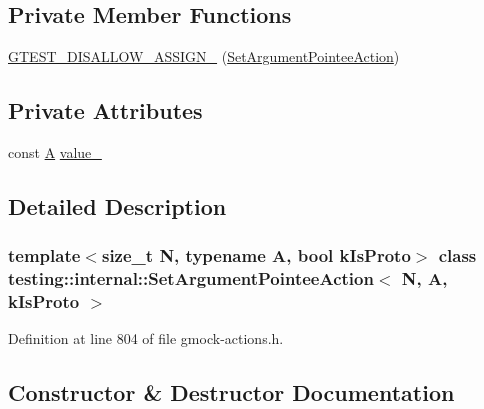 \subsection*{Private Member Functions}
\begin{DoxyCompactItemize}
\item 
\hyperlink{classtesting_1_1internal_1_1SetArgumentPointeeAction_ae2680fa62fa184b56c88743141baac60}{G\+T\+E\+S\+T\+\_\+\+D\+I\+S\+A\+L\+L\+O\+W\+\_\+\+A\+S\+S\+I\+G\+N\+\_\+} (\hyperlink{classtesting_1_1internal_1_1SetArgumentPointeeAction}{Set\+Argument\+Pointee\+Action})
\end{DoxyCompactItemize}
\subsection*{Private Attributes}
\begin{DoxyCompactItemize}
\item 
const \hyperlink{namespacetesting_a5e9134d655d2fc9323902348083282e7}{A} \hyperlink{classtesting_1_1internal_1_1SetArgumentPointeeAction_a57dba59652a5ea603c5e12c72e195b13}{value\+\_\+}
\end{DoxyCompactItemize}


\subsection{Detailed Description}
\subsubsection*{template$<$size\+\_\+t N, typename A, bool k\+Is\+Proto$>$\newline
class testing\+::internal\+::\+Set\+Argument\+Pointee\+Action$<$ N, A, k\+Is\+Proto $>$}



Definition at line 804 of file gmock-\/actions.\+h.



\subsection{Constructor \& Destructor Documentation}
\mbox{\label{classtesting_1_1internal_1_1SetArgumentPointeeAction_a5a4119ed113667bd4a003ab0bec2cdff}} 
